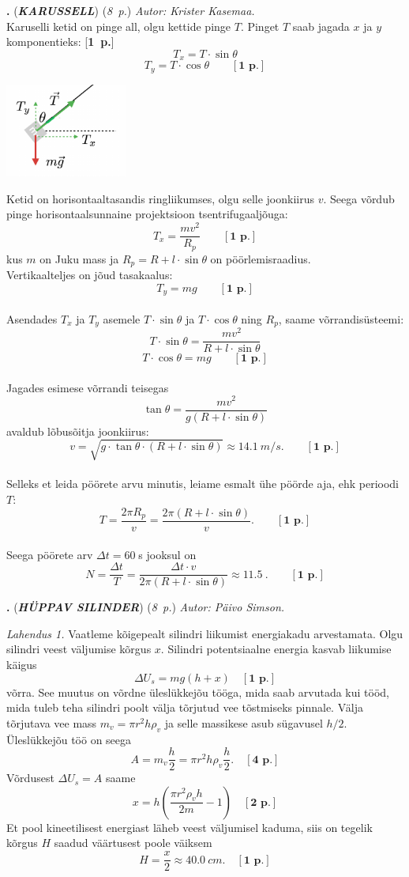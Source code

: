 \documentclass[12pt,a5paper]{article}
\newcommand{\numb}[1]{\vspace{5pt}\textbf{\large #1}}
\newcommand{\nimi}[1]{(\textsl{\small #1})}
\newcommand{\punktid}[1]{(\emph{#1~p.})}
\newcounter{ylesanne}
\newcommand{\yl}[1]{\addtocounter{ylesanne}{1}\numb{\theylesanne.} \nimi{\bf{#1}} \newblock{}}
\newcommand{\pp}[1]{[\textbf{#1~p.}]}
\newcommand{\autor}[1]{\emph{ Autor: #1.\\}}
\begin{document}
\yl{KARUSSELL} \punktid{8} \autor{Krister Kasemaa}
Karuselli ketid on pinge all, olgu kettide pinge $T$. Pinget $T$ saab jagada $x$ ja $y$ komponentieks: \pp{1} 
$$T_x=T \cdot \sin{\theta}$$
$$T_y=T \cdot \cos{\theta} \qquad \pp{1} $$
 \begin{center}
\includegraphics[width=0.3\textwidth]{Karussell}
\end{center}
Ketid on horisontaaltasandis ringliikumses, olgu selle joonkiirus $v$. Seega võrdub pinge horisontaalsunnaine projektsioon tsentrifugaaljõuga:
$$T_x = \frac{m v^2}{R_{p}}\quad\quad \pp{1}$$
kus $m$ on Juku mass ja $R_{p} = R + l \cdot \sin{\theta}$ on pöörlemisraadius.
\\
Vertikaalteljes on jõud tasakaalus:
$$T_y=mg \quad \quad \pp{1}$$ 
\\
Asendades $T_x$ ja $T_y$ asemele $T \cdot \sin{\theta}$ ja $T \cdot \cos{\theta}$ ning $R_{p}$, saame võrrandisüsteemi:
$$T \cdot \sin{\theta} = \frac{m v^2}{R + l \cdot \sin{\theta}}$$
$$T \cdot \cos{\theta} = mg \qquad \pp{1}$$ 
\\
Jagades esimese võrrandi teisegas
$$\tan{\theta}= \frac{mv^2}{g(R + l \cdot \sin{\theta})}$$
avaldub lõbusõitja joonkiirus:
$$v= \sqrt{g \cdot \tan{\theta} \cdot (R + l \cdot \sin{\theta})}\approx \SI{14.1}{m/s}. \qquad \pp{1}$$ 
\\
Selleks et leida pöörete arvu minutis, leiame esmalt ühe pöörde aja, ehk perioodi $T$:
$$T=\frac{2 \pi R_{p}}{v}=\frac{2 \pi (R + l \cdot \sin{\theta})}{v}. \qquad \pp{1}$$ 
\\
Seega pöörete arv  $\Delta t = 60\;$s jooksul on
$$N=\frac{\Delta t}{T} =\frac{\Delta t \cdot v}{2 \pi (R + l \cdot \sin{\theta})} \approx \SI{11.5}{}. \qquad \pp{1}$$ 



\yl{HÜPPAV SILINDER} \punktid{8} \autor{Päivo Simson}

\emph{Lahendus 1.}
Vaatleme kõigepealt silindri liikumist energiakadu arvestamata. Olgu silindri veest väljumise kõrgus $x$. Silindri potentsiaalne energia kasvab liikumise käigus
\[
\Delta U_s=mg(h+x)\quad[\textbf{1 p.}]
\]
võrra. See muutus on võrdne üleslükkejõu tööga, mida saab arvutada kui tööd, mida tuleb teha silindri poolt välja tõrjutud vee tõstmiseks pinnale. Välja tõrjutava vee mass $m_v=\pi r^2 h \rho_v$ ja selle massikese asub sügavusel $h/2$. Üleslükkejõu töö on seega
\[
A=m_v\frac{h}{2}=\pi r^2 h \rho_v\frac{h}{2}.\quad[\textbf{4 p.}]
\]
Võrdusest $\Delta U_s=A$ saame
\[
x=h\left(\frac{\pi r^2 \rho_v h}{2m}-1\right) \quad[\textbf{2 p.}]
\]
Et pool kineetilisest energiast läheb veest väljumisel kaduma, siis on tegelik kõrgus $H$ saadud väärtusest poole väiksem
\[
H=\frac{x}{2}\approx\SI{40.0}{cm}. \quad[\textbf{1 p.}]
\]
\end{document}
